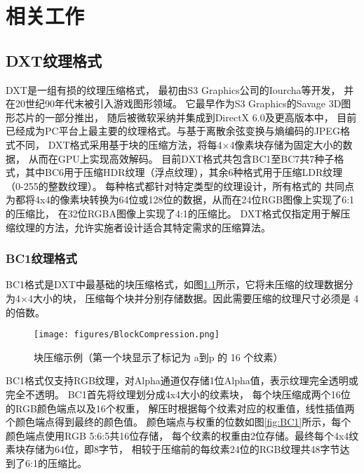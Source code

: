 
\chapter{相关工作}

\section{DXT纹理格式}

DXT是一组有损的纹理压缩格式，
最初由S3 Graphics公司的Iourcha等\cite{iourcha1999system}开发，
并在20世纪90年代末被引入游戏图形领域。
它最早作为S3 Graphics的Savage 3D图形芯片的一部分推出，
随后被微软采纳并集成到DirectX 6.0及更高版本中，
目前已经成为PC平台上最主要的纹理格式。与基于离散余弦变换与熵编码的JPEG格式不同，
DXT格式采用基于块的压缩方法，将每4×4像素块存储为固定大小的数据，
从而在GPU上实现高效解码。
目前DXT格式共包含BC1至BC7共7种子格式，其中BC6用于压缩HDR纹理（浮点纹理），其余6种格式用于压缩LDR纹理（0-255的整数纹理）。
每种格式都针对特定类型的纹理设计，所有格式的
共同点为都将4x4的像素块转换为64位或128位的数据，从而在24位RGB图像上实现了6:1的压缩比，
在32位RGBA图像上实现了4:1的压缩比。
DXT格式仅指定用于解压缩纹理的方法，允许实施者设计适合其特定需求的压缩算法。

\subsection{BC1纹理格式}

BC1格式是DXT中最基础的块压缩格式，如图\ref{fig:BlockCompression}所示，它将未压缩的纹理数据分为4×4大小的块，
压缩每个块并分别存储数据。因此需要压缩的纹理尺寸必须是 4 的倍数。

\begin{figure}[htbp]
    \centering
    \texttt{[image: figures/BlockCompression.png]}
    \caption{块压缩示例（第一个块显示了标记为 a到p 的 16 个纹素）\cite{BC1-5}}
    \label{fig:BlockCompression}
\end{figure}

BC1格式仅支持RGB纹理，对Alpha通道仅存储1位Alpha值，表示纹理完全透明或完全不透明。
BC1首先将纹理划分成4x4大小的纹素块，
每个块压缩成两个16位的RGB颜色端点以及16个权重，
解压时根据每个纹素对应的权重值，线性插值两个颜色端点得到最终的颜色值。
颜色端点与权重的位数如图\ref{fig:BC1}所示，每个颜色端点使用RGB 5:6:5共16位存储，
每个纹素的权重由2位存储。最终每个4x4纹素块存储为64位，即8字节，
相较于压缩前的每纹素24位的RGB纹理共48字节达到了6:1的压缩比。

